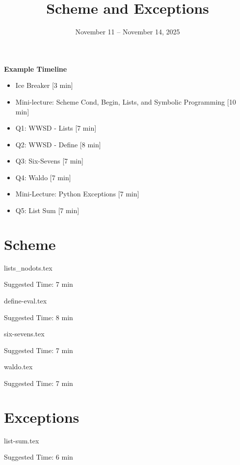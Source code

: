 \documentclass{exam}
\title{Scheme and Exceptions}
\date{November 11 -- November 14, 2025}
\begin{document}
\maketitle

\begin{meta}
    \textbf{Example Timeline}
    \begin{itemize}
        \item Ice Breaker [3 min]
        \item Mini-lecture: Scheme Cond, Begin, Lists, and Symbolic Programming [10 min]
        \item Q1: WWSD - Lists  [7 min]
        \item Q2: WWSD - Define [8 min]
        \item Q3: Six-Sevens [7 min]
        \item Q4: Waldo [7 min]
        \item Mini-Lecture: Python Exceptions [7 min]
        \item Q5: List Sum [7 min]
    \end{itemize}

\end{meta}

\section{Scheme}
\begin{questions}
    {lists_nodots.tex}
    \begin{questionmeta}
        Suggested Time: 7 min
    \end{questionmeta}

    {define-eval.tex}
    \begin{questionmeta}
        Suggested Time: 8 min
    \end{questionmeta}

     {six-sevens.tex}
    \begin{questionmeta}
        Suggested Time: 7 min
    \end{questionmeta}

    {waldo.tex}
    \begin{questionmeta}
        Suggested Time: 7 min
    \end{questionmeta}

\end{questions}

\section{Exceptions}
\begin{questions}

    {list-sum.tex}
    \begin{questionmeta}
        Suggested Time: 6 min
    \end{questionmeta}


\end{questions}
\end{document}
